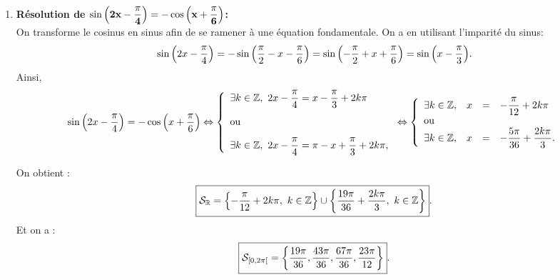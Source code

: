 \documentclass[a4paper, 11pt]{article}
\begin{document}
\begin{correction}
\begin{enumerate}
\begin{minipage}[c]{0.45\textwidth}
\begin{center}
\end{center}
\end{minipage}
\item \textbf{R\'esolution de $\mathbf{ \sin{\left(2x-\displaystyle\frac{\pi}{4}\right)}=-\cos{\left(x+\displaystyle\frac{\pi}{6}\right)} }$:}\\
\noindent
On transforme le cosinus en sinus afin de se ramener \`a une \'equation fondamentale.
On a en utilisant l'imparit\'e du sinus:
$$
\sin{\left(2x-\displaystyle\frac{\pi}{4}\right)}=-\sin{\left(\displaystyle\frac{\pi}{2}-x-\frac{\pi}{6}\right)}
=\sin{\left(-\displaystyle\frac{\pi}{2}+x+\frac{\pi}{6}\right)}
=\sin{\left(x-\displaystyle\frac{\pi}{3}\right)}.$$
Ainsi,
$$
\sin{\left(2x-\ddp\frac{\pi}{4}\right)}=-\cos{\left(x+\ddp\frac{\pi}{6}\right)} \Leftrightarrow  \left\lbrace \begin{array}{l}
\exists k\in\Z,\ 2x-\ddp\frac{\pi}{4}=x-\ddp\frac{\pi}{3}+2k\pi\vsec\\
\hbox{ou}\vsec\\
\exists k\in\Z,\ 2x-\ddp\frac{\pi}{4}=\pi-x+\ddp\frac{\pi}{3}+2k\pi,
\end{array}\right.
\Leftrightarrow \left\lbrace\begin{array}{llll}
\exists k\in\Z, &x&=&-\ddp\frac{\pi}{12}+2k\pi\\
\hbox{ou}\\
\exists k\in\Z,& x&=&-\ddp\frac{5\pi}{36}+\frac{2k\pi}{3}.\\
\end{array}\right.$$
\begin{minipage}[c]{0.45\textwidth}
On obtient :
$$\fbox{$\mathcal{S}_{\mathbb{R}}=\left\lbrace -\displaystyle\frac{\pi}{12}+2k\pi,\ k\in\mathbb{Z}  \right\rbrace\cup \left\lbrace \displaystyle\frac{19\pi}{36}+\frac{2k\pi}{3},\ k\in\mathbb{Z}  \right\rbrace$}.$$ 
Et on a :
$$\fbox{$\mathcal{S}_{\lbrack 0,2\pi\lbrack}=\left\lbrace \displaystyle\frac{19\pi}{36}, \displaystyle\frac{43\pi}{36} ,\displaystyle\frac{67\pi}{36},\displaystyle\frac{23\pi}{12} \right\rbrace$}.$$
\end{minipage}
\quad \begin{minipage}[c]{0.45\textwidth}
\begin{center}
\end{center}
\end{minipage}
\end{enumerate}
\end{correction}
\end{document}
